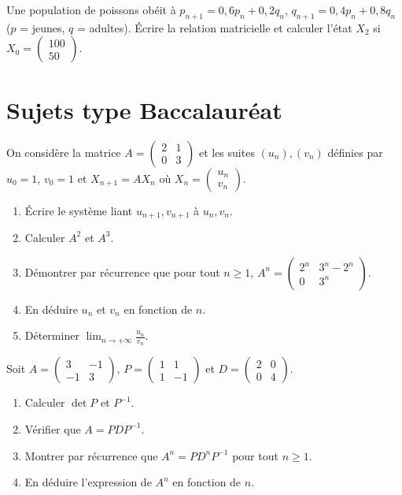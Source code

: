 \exo{} Une population de poissons obéit à $p_{n+1}=0{,}6p_n+0{,}2q_n$,
$q_{n+1}=0{,}4p_n+0{,}8q_n$ ($p$ = jeunes, $q$ = adultes). Écrire la relation matricielle et
calculer l'état $X_2$ si $X_0=\begin{pmatrix}100\\50\end{pmatrix}$.

\section{Sujets type Baccalauréat}

On considère la matrice $A=\begin{pmatrix}2&1\\0&3\end{pmatrix}$ et les suites $(u_n),(v_n)$
définies par $u_0=1$, $v_0=1$ et $X_{n+1}=AX_n$ où $X_n=\begin{pmatrix}u_n\\v_n\end{pmatrix}$.
\begin{enumerate}[label=\arabic*)]
\item Écrire le système liant $u_{n+1},v_{n+1}$ à $u_n,v_n$.
\item Calculer $A^2$ et $A^3$.
\item Démontrer par récurrence que pour tout $n\ge1$, $A^n=\begin{pmatrix}2^n&3^n-2^n\\0&3^n\end{pmatrix}$.
\item En déduire $u_n$ et $v_n$ en fonction de $n$.
\item Déterminer $\displaystyle\lim_{n\to+\infty}\frac{u_n}{v_n}$.
\end{enumerate}

Soit $A=\begin{pmatrix}3&-1\\-1&3\end{pmatrix}$, $P=\begin{pmatrix}1&1\\1&-1\end{pmatrix}$ et
$D=\begin{pmatrix}2&0\\0&4\end{pmatrix}$.
\begin{enumerate}[label=\arabic*)]
\item Calculer $\det P$ et $P^{-1}$.
\item Vérifier que $A=PDP^{-1}$.
\item Montrer par récurrence que $A^n=PD^nP^{-1}$ pour tout $n\ge1$.
\item En déduire l'expression de $A^n$ en fonction de $n$.
\end{enumerate}

